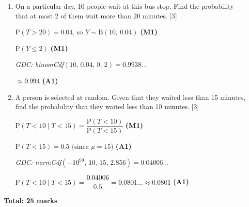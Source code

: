 \documentclass[12pt, twoside]{article}
\begin{document}
\begin{enumerate}[itemsep=0.15cm]
\begin{enumerate}[itemsep=0.3cm]
  \emph{GDC: normCdf$(-10^{99},\, 12,\, 15,\, 2.856)$} \hfill \textbf{(M1)}

  $= 0.1468\ldots \approx 0.147$ \hfill \textbf{(A1)}

  \item On a particular day, 10 people wait at this bus stop. Find the probability
        that at most 2 of them wait more than 20 minutes. \hfill [3]

  $\mathrm{P}(T > 20) = 0.04$, so $Y \sim \mathrm{B}(10,\, 0.04)$ \hfill \textbf{(M1)}

  $\mathrm{P}(Y \leq 2)$ \hfill \textbf{(M1)}

  \emph{GDC: binomCdf$(10,\, 0.04,\, 0,\, 2) = 0.9938\ldots$}

  $\approx 0.994$ \hfill \textbf{(A1)}

  \item A person is selected at random. Given that they waited less than
        15 minutes, find the probability that they waited less than
        10 minutes. \hfill [3]

  $\mathrm{P}(T < 10 \mid T < 15)
    = \dfrac{\mathrm{P}(T < 10)}{\mathrm{P}(T < 15)}$ \hfill \textbf{(M1)}

  $\mathrm{P}(T < 15) = 0.5$ (since $\mu = 15$) \hfill \textbf{(A1)}

  \emph{GDC: normCdf$(-10^{99},\, 10,\, 15,\, 2.856) = 0.04006\ldots$}

  $\mathrm{P}(T < 10 \mid T < 15) = \dfrac{0.04006}{0.5} = 0.0801\ldots \approx 0.0801$ \hfill \textbf{(A1)}
\end{enumerate}

\bigskip
\noindent\textbf{Total: 25 marks}

\end{enumerate}
\end{document}
